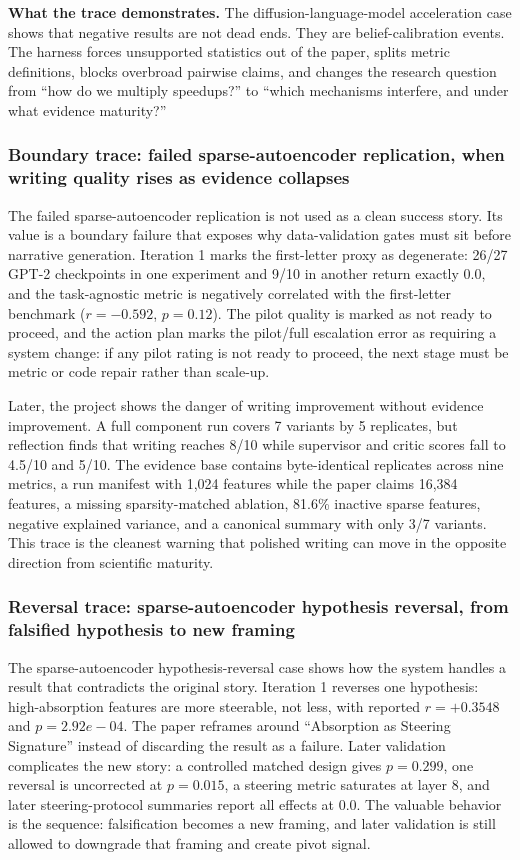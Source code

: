 \documentclass{article}
\begin{document}
\textbf{What the trace demonstrates.} The diffusion-language-model acceleration case shows that negative results are not dead ends. They are belief-calibration events. The harness forces unsupported statistics out of the paper, splits metric definitions, blocks overbroad pairwise claims, and changes the research question from ``how do we multiply speedups?'' to ``which mechanisms interfere, and under what evidence maturity?''

\subsubsection{Boundary trace: failed sparse-autoencoder replication, when writing quality rises as evidence collapses}

The failed sparse-autoencoder replication is not used as a clean success story. Its value is a boundary failure that exposes why data-validation gates must sit before narrative generation. Iteration 1 marks the first-letter proxy as degenerate: 26/27 GPT-2 checkpoints in one experiment and 9/10 in another return exactly 0.0, and the task-agnostic metric is negatively correlated with the first-letter benchmark ($r=-0.592$, $p=0.12$). The pilot quality is marked as not ready to proceed, and the action plan marks the pilot/full escalation error as requiring a system change: if any pilot rating is not ready to proceed, the next stage must be metric or code repair rather than scale-up.

Later, the project shows the danger of writing improvement without evidence improvement. A full component run covers 7 variants by 5 replicates, but reflection finds that writing reaches 8/10 while supervisor and critic scores fall to 4.5/10 and 5/10. The evidence base contains byte-identical replicates across nine metrics, a run manifest with 1,024 features while the paper claims 16,384 features, a missing sparsity-matched ablation, 81.6\% inactive sparse features, negative explained variance, and a canonical summary with only 3/7 variants. This trace is the cleanest warning that polished writing can move in the opposite direction from scientific maturity.

\subsubsection{Reversal trace: sparse-autoencoder hypothesis reversal, from falsified hypothesis to new framing}

The sparse-autoencoder hypothesis-reversal case shows how the system handles a result that contradicts the original story. Iteration 1 reverses one hypothesis: high-absorption features are more steerable, not less, with reported $r=+0.3548$ and $p=2.92e{-}04$. The paper reframes around ``Absorption as Steering Signature'' instead of discarding the result as a failure. Later validation complicates the new story: a controlled matched design gives $p=0.299$, one reversal is uncorrected at $p=0.015$, a steering metric saturates at layer 8, and later steering-protocol summaries report all effects at 0.0. The valuable behavior is the sequence: falsification becomes a new framing, and later validation is still allowed to downgrade that framing and create pivot signal.
\end{document}

